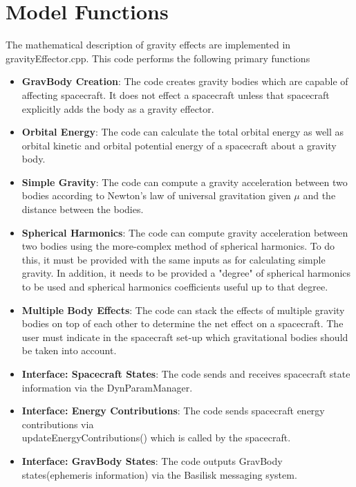 \section{Model Functions}
The mathematical description of gravity effects are implemented in gravityEffector.cpp. This code performs the following primary functions
\begin{itemize}
	\item \textbf{GravBody Creation}: The code creates gravity bodies which are capable of affecting spacecraft. It does not effect a spacecraft unless that spacecraft explicitly adds the body as a gravity effector.
	\item \textbf{Orbital Energy}: The code can calculate the total orbital energy as well as orbital kinetic and orbital potential energy of a spacecraft about a gravity body.
	\item \textbf{Simple Gravity}: The code can compute a gravity acceleration between two bodies according to Newton's law of universal gravitation given $\mu$ and the distance between the bodies.
	\item \textbf{Spherical Harmonics}: The code can compute gravity acceleration between two bodies using the more-complex method of spherical harmonics. To do this, it must be provided with the same inputs as for calculating simple gravity. In addition, it needs to be provided a "degree" of spherical harmonics to be used and spherical harmonics coefficients useful up to that degree.
	\item \textbf{Multiple Body Effects}: The code can stack the effects of multiple gravity bodies on top of each other to determine the net effect on a spacecraft. The user must indicate in the spacecraft set-up which gravitational bodies should be taken into account.
	\item \textbf{Interface: Spacecraft States}: The code sends and receives spacecraft state information via the DynParamManager.
	\item \textbf{Interface: Energy Contributions}: The code sends spacecraft energy contributions via \\updateEnergyContributions() which is called by the spacecraft.
	\item \textbf{Interface: GravBody States}: The code outputs GravBody states(ephemeris information) via the Basilisk messaging system.
	
\end{itemize}

